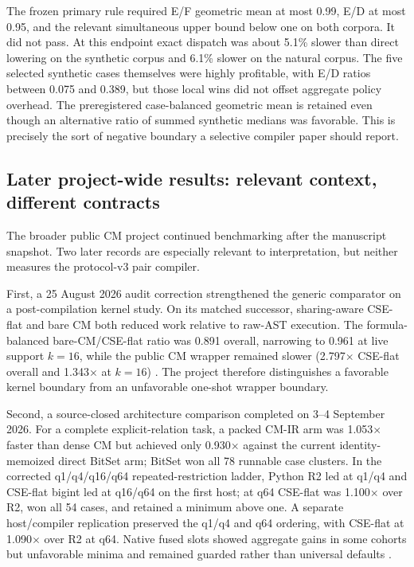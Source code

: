 \documentclass[10pt]{article}
\theoremstyle{plain}
\theoremstyle{definition}
\theoremstyle{remark}
\begin{document}
The frozen primary rule required E/F geometric mean at most 0.99, E/D at most 0.95, and the relevant simultaneous upper bound below one on both corpora. It did not pass. At this endpoint exact dispatch was about 5.1\% slower than direct lowering on the synthetic corpus and 6.1\% slower on the natural corpus. The five selected synthetic cases themselves were highly profitable, with E/D ratios between 0.075 and 0.389, but those local wins did not offset aggregate policy overhead. The preregistered case-balanced geometric mean is retained even though an alternative ratio of summed synthetic medians was favorable. This is precisely the sort of negative boundary a selective compiler paper should report.

\subsection{Later project-wide results: relevant context, different contracts}
\label{sec:later-context}

The broader public CM project continued benchmarking after the manuscript snapshot. Two later records are especially relevant to interpretation, but neither measures the protocol-v3 pair compiler.

First, a 25 August 2026 audit correction strengthened the generic comparator on a post-compilation kernel study. On its matched successor, sharing-aware CSE-flat and bare CM both reduced work relative to raw-AST execution. The formula-balanced bare-CM/CSE-flat ratio was 0.891 overall, narrowing to 0.961 at live support $k=16$, while the public CM wrapper remained slower (2.797$\times$ CSE-flat overall and 1.343$\times$ at $k=16$) \cite{ProjectCorrection20260825}. The project therefore distinguishes a favorable kernel boundary from an unfavorable one-shot wrapper boundary.

Second, a source-closed architecture comparison completed on 3--4 September 2026. For a complete explicit-relation task, a packed CM-IR arm was 1.053$\times$ faster than dense CM but achieved only 0.930$\times$ against the current identity-memoized direct BitSet arm; BitSet won all 78 runnable case clusters. In the corrected q1/q4/q16/q64 repeated-restriction ladder, Python R2 led at q1/q4 and CSE-flat bigint led at q16/q64 on the first host; at q64 CSE-flat was 1.100$\times$ over R2, won all 54 cases, and retained a minimum above one. A separate host/compiler replication preserved the q1/q4 and q64 ordering, with CSE-flat at 1.090$\times$ over R2 at q64. Native fused slots showed aggregate gains in some cohorts but unfavorable minima and remained guarded rather than universal defaults \cite{ProjectArchitecture20260903}.
\end{document}
